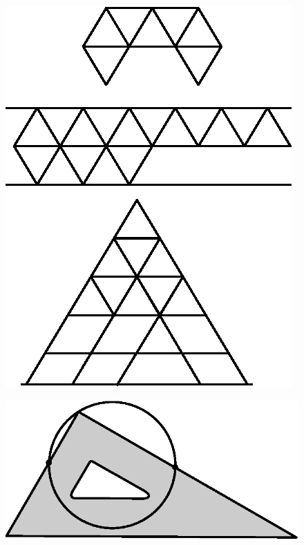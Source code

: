 \begin{figure}[H]
\centering
\includegraphics[scale=.9]{figure/fig_24.eps}
\caption{}\label{chap6-fig24}
\end{figure}

\begin{figure}[H]
\centering
\includegraphics[scale=.9]{figure/fig_25.eps}
\caption{}\label{chap6-fig25}
\end{figure}

